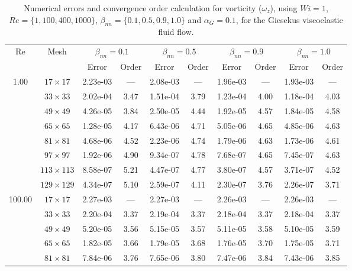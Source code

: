 \documentclass[preprint, 12pt]{elsarticle}
\begin{document}
\begin{center}
\begin{table}[H]
\caption{Numerical errors and convergence order calculation for vorticity ($\omega_{z}$), using \mbox{$Wi=1$}, $Re=\{1,100,400,1000\}$, $\beta_{nn}=\{0.1,0.5,0.9,1.0\}$ and $\alpha_G = 0.1$, for the Giesekus viscoelastic fluid flow.\label{tab_GiesekusWzalphaG01Resumida}}
\scriptsize{
    \begin{tabular*}{\textwidth}{@{\extracolsep\fill}cccccccccc@{}}
    \hline
    \multirow{2}{*}{$\operatorname{Re}$} & \multirow{2}{*}{Mesh} & \multicolumn{2}{c}{$\beta_{nn}=0.1$}  & \multicolumn{2}{c}{$\beta_{nn}=0.5$}  & \multicolumn{2}{c}{$\beta_{nn}=0.9$}  & \multicolumn{2}{c}{$\beta_{nn}=1.0$}\\ %
     & & Error & Order & Error & Order & Error & Order & Error & Order \\
    \hline
    \multirow{7}{*}{1.00} & $17\times 17$ & 2.23e-03 & --- & 2.08e-03 & --- & 1.96e-03 & --- & 1.93e-03 & --- \\
    & $33\times 33$ & 2.02e-04 & 3.47 & 1.51e-04 & 3.79 & 1.23e-04 & 4.00 & 1.18e-04 & 4.03 \\
    & $49\times 49$ & 4.26e-05 & 3.84 & 2.50e-05 & 4.44 & 1.92e-05 & 4.57 & 1.84e-05 & 4.58 \\
    & $65\times 65$ & 1.28e-05 & 4.17 & 6.43e-06 & 4.71 & 5.05e-06 & 4.65 & 4.85e-06 & 4.63 \\
    & $81\times 81$ & 4.68e-06 & 4.52 & 2.23e-06 & 4.74 & 1.79e-06 & 4.63 & 1.73e-06 & 4.61 \\
    & $97\times 97$ & 1.92e-06 & 4.90 & 9.34e-07 & 4.78 & 7.68e-07 & 4.65 & 7.45e-07 & 4.63 \\
    & $113\times 113$ & 8.58e-07 & 5.21 & 4.47e-07 & 4.77 & 3.80e-07 & 4.57 & 3.71e-07 & 4.52 \\
    & $129\times 129$ & 4.34e-07 & 5.10 & 2.59e-07 & 4.11 & 2.30e-07 & 3.76 & 2.26e-07 & 3.71 \\
    \hline
    \multirow{7}{*}{100.00} & $17\times 17$ & 2.27e-03 & --- & 2.27e-03 & --- & 2.26e-03 & --- & 2.26e-03 & --- \\
    & $33\times 33$ & 2.20e-04 & 3.37 & 2.19e-04 & 3.37 & 2.18e-04 & 3.37 & 2.18e-04 & 3.37 \\
    & $49\times 49$ & 5.20e-05 & 3.56 & 5.15e-05 & 3.57 & 5.11e-05 & 3.58 & 5.10e-05 & 3.59 \\
    & $65\times 65$ & 1.82e-05 & 3.66 & 1.79e-05 & 3.68 & 1.76e-05 & 3.70 & 1.75e-05 & 3.71 \\
    & $81\times 81$ & 7.84e-06 & 3.76 & 7.65e-06 & 3.80 & 7.47e-06 & 3.84 & 7.43e-06 & 3.85 \\

\end{tabular*}}
\end{table}
\end{center}
\end{document}
